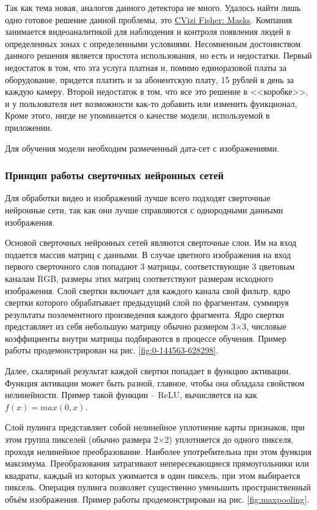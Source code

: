 \documentclass[a4paper,14pt]{article}
\begin{document}
	Так как тема новая, аналогов данного детектора не много.
	Удалось найти лишь одно готовое решение данной проблемы, это \href{https://fisher.cvizi.com/#solutions}{CVizi Fisher: Masks}.
	Компания занимается видеоаналитикой для наблюдения и контроля появления людей в определенных зонах с определенными условиями. 
	Несомненным достоинством данного решения является простота использования, но есть и недостатки.
	Первый недостаток в том, что эта услуга платная и, помимо единоразовой платы за оборудование, придется платить и за абонентскую плату, 15 рублей в день за каждую камеру.
	Второй недостаток в том, что все это решение в <<коробке>>, и у пользователя нет возможности как-то добавить или изменить функционал,
	Кроме этого, нигде не упоминается о качестве модели, используемой в приложении.
	
	Для обучения модели необходим размеченный дата-сет с изображениями.
	
	\subsubsection{Принцип работы сверточных нейронных сетей}
	
	Для обработки видео и изображений лучше всего подходят сверточные нейронные сети, так как они лучше справляются с однородными данными изображения.
	
	Основой сверточных нейронных сетей являются сверточные слои.
	Им на вход подается массив матриц с данными.
	В случае цветного изображения на вход первого сверточного слоя попадают 3 матрицы, соответствующие 3 цветовым каналам RGB, размеры этих матриц соответствуют размерам исходного изображения.
	Слой свертки включает для каждого канала свой фильтр, ядро свертки которого обрабатывает предыдущий слой по фрагментам, суммируя результаты поэлементного произведения каждого фрагмента.
	Ядро свертки представляет из себя небольшую матрицу обычно размером 3×3, числовые коэффициенты внутри матрицы подбираются в процессе обучения.
	Пример работы продемонстрирован на рис. \ref{fig:0-144563-628298}.
	
	Далее, скалярный результат каждой свертки попадает в функцию активации.
	Функция активации может быть разной, главное, чтобы она обладала свойством нелинейности.
	Пример такой функции -- ReLU, вычисляется на как $f(x) = max(0,x)$.
	
	Слой пулинга представляет собой нелинейное уплотнение карты признаков, при этом группа пикселей (обычно размера 2×2) уплотняется до одного пикселя, проходя нелинейное преобразование.
	Наиболее употребительна при этом функция максимума.
	Преобразования затрагивают непересекающиеся прямоугольники или квадраты, каждый из которых ужимается в один пиксель, при этом выбирается пиксель.
	Операция пулинга позволяет существенно уменьшить пространственный объём изображения. 
	Пример работы продемонстрирован на рис. \ref{fig:maxpooling}.
	
\end{document}
